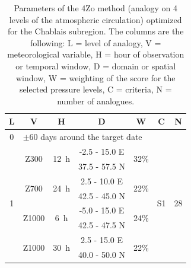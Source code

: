 \documentclass[5p]{elsarticle}
\begin{document}
\begin{table}[htb]
	\caption{Parameters of the 4Zo method (analogy on 4 levels of the atmospheric circulation) optimized for the Chablais subregion. The columns are the following: L = level of analogy, V = meteorological variable, H = hour of observation or temporal window, D = domain or spatial window, W = weighting of the score for the selected pressure levels, C = criteria, N = number of analogues.}
	\footnotesize
	\begin{center}
		\begin{tabular}{ccccccc}
			\hline L & V & H & D & W & C & N \\ 
			\hline 
			0 & \multicolumn{6}{l}{$\pm 60$ days around the target date} \\
			\hline 
			\multirow{8}{*}{1} &  \multirow{2}{*}{Z300} & \multirow{2}{*}{12~h} & -2.5 - 15.0 \degree E & \multirow{2}{*}{32\%} & \multirow{8}{*}{S1} & \multirow{8}{*}{28} \\
			& & & 37.5 - 57.5 \degree N & & & \\ 
			& \multirow{2}{*}{Z700} & \multirow{2}{*}{24~h} & 2.5 - 10.0 \degree E & \multirow{2}{*}{22\%} & & \\ 
			& & & 42.5 - 45.0 \degree N & & & \\ 
			& \multirow{2}{*}{Z1000} & \multirow{2}{*}{6~h} & -5.0 - 15.0 \degree E & \multirow{2}{*}{24\%} & & \\ 
			& & & 42.5 - 47.5 \degree N & & & \\ 
			& \multirow{2}{*}{Z1000} & \multirow{2}{*}{30~h} & 2.5 - 15.0 \degree E & \multirow{2}{*}{22\%} & & \\ 
			& & & 40.0 - 50.0 \degree N & & & \\ 
			\hline 
		\end{tabular} 
	\end{center}
	\label{table:params_GA_4Zo}
\end{table}
\end{document}
